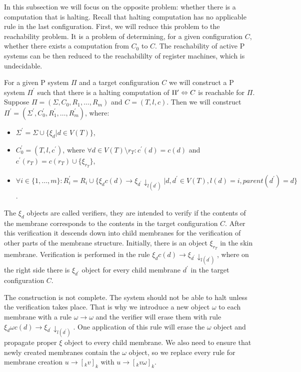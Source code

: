 In this subsection we will focus on the opposite problem: whether there is a computation that is halting. Recall that halting computation has no applicable rule in the last configuration.
First, we will reduce this problem to the reachability problem. It is a problem of determining, for a given configuration $C$, whether there exists a computation from $C_0$ to $C$. The reachability of active P systems can be then reduced to the reachabililty of register machines, which is undecidable.

For a given P system $\Pi$ and a target configuration $C$ we will construct a P system $\Pi^\prime$ such that there is a halting computation of $\Pi^\prime\Leftrightarrow\linebreak C$ is reachable for $\Pi$. Suppose $\Pi = (\Sigma, C_0, R_1, \ldots, R_m)$ and $C = (T, l, c)$. Then we will construct $\Pi^\prime = (\Sigma^\prime, C_0^\prime, R_1^\prime, \ldots, R_m^\prime)$, where:

\begin{itemize}
  \item $\Sigma^\prime = \Sigma\cup\{\xi_d|d\in V(T)\}$,
  \item $C_0^\prime = (T, l, c^\prime)$, where $\forall d\in V(T)\setminus r_T: c^\prime(d) = c(d)$ and $c^\prime(r_T) = c(r_T)\cup\{\xi_{r_T}\}$,
  \item $\forall i\in\{1,\ldots, m\}: R_i^\prime = R_i\cup\{\xi_d c(d)\rightarrow\xi_{d^\prime}\downarrow_{l(d^\prime)}|d,d^\prime\in V(T),l(d)=i,parent(d^\prime)=d\}$.
\end{itemize}

The $\xi_d$ objects are called verifiers, they are intended to verify if the contents of the membrane corresponds to the contents in the target configuration $C$. After this verification it descends down into child membranes for the verification of other parts of the membrane structure.
Initially, there is an object $\xi_{r_T}$ in the skin membrane. Verification is performed in the rule $\xi_d c(d)\rightarrow\xi_{d^\prime}\downarrow_{l(d^\prime)}$, where on the right side there is $\xi_{d^\prime}$ object for every child membrane $d^\prime$ in the target configuration $C$.

The construction is not complete. The system should not be able to halt unless the verification takes place. That is why we introduce a new object $\omega$ to each membrane with a rule $\omega\rightarrow\omega$ and the verifier will erase them with rule $\xi_d\omega c(d)\rightarrow\xi_{d^\prime}\downarrow_{l(d^\prime)}$. One application of this rule will erase the $\omega$ object and propagate proper $\xi$ object to every child membrane. We also need to ensure that newly created membranes contain the $\omega$ object, so we replace every rule for membrane creation $u\rightarrow [_k v]_k$ with $u\rightarrow [_k v\omega]_k$.

